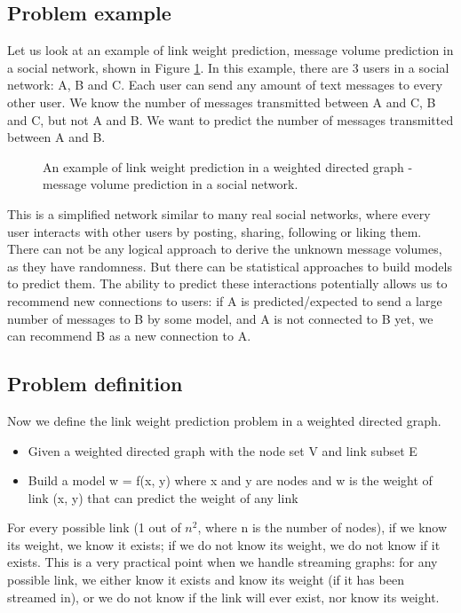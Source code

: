 \documentclass[book,12pt]{WSUThesis}
\theoremstyle{definition}
\begin{document}
\subsection{Problem example}
Let us look at an example of link weight prediction, message volume prediction in a social network, shown in Figure \ref{fig:example}.
In this example, there are 3 users in a social network: A, B and C.
Each user can send any amount of text messages to every other user.
We know the number of messages transmitted between A and C, B and C, but not A and B.
We want to predict the number of messages transmitted between A and B.
\begin{figure}[!htb]\centering
	\caption{
		An example of link weight prediction in a weighted directed graph -
		message volume prediction in a social network.
	}
	\label{fig:example}
\end{figure}

This is a simplified network similar to many real social networks, where every user interacts with other users by posting, sharing, following or liking them.
There can not be any logical approach to derive the unknown message volumes,
as they have randomness.
But there can be statistical approaches to build models to predict them.
The ability to predict these interactions potentially allows us to recommend new connections to users:
if A is predicted/expected to send a large number of messages to B by some model,
and A is not connected to B yet,
we can recommend B as a new connection to A.

\subsection{Problem definition}
Now we define the link weight prediction problem in a weighted directed graph.
\begin{itemize}
	\item Given a weighted directed graph with the node set V and link subset E
	\item Build a model w = f(x, y) where x and y are nodes and w is the weight of link (x, y) that can predict the weight of any link
\end{itemize}
For every possible link (1 out of $ n^2 $, where n is the number of nodes), 
if we know its weight, we know it exists;
if we do not know its weight, we do not know if it exists.
This is a very practical point when we handle streaming graphs:
for any possible link,
we either know it exists and know its weight (if it has been streamed in), or we do not know if the link will ever exist, nor know its weight.
\end{document}
